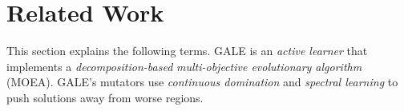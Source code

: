 \documentclass[10pt,journal,compsoc]{IEEEtran}
\newcommand{\tion}[1]{\textsection\ref{sec:#1}}
\newcommand{\fig}[1]{Figure~\ref{fig:#1}}
\begin{document}


\section{Related Work}
This section explains the following terms.
GALE is an {\em active learner} that implements a {\em decomposition-based} {\em multi-objective evolutionary algorithm} (MOEA).
GALE's mutators use  {\em continuous domination} and {\em spectral learning} to push solutions away from worse regions.



\end{document}
